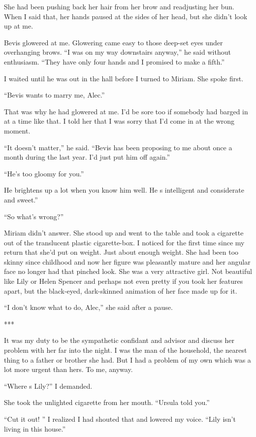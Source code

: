 \documentclass{novel}
\begin{document}
She had been pushing back her hair from her brow and readjusting her bun. When I said that, her hands paused at the sides of her head, but she didn’t look up at me.

Bevis glowered at me. Glowering came easy to those deep-set eyes under overhanging brows. “I was on my way downstairs anyway,” he said without enthusiasm. “They have only four hands and I promised to make a fifth.”

I waited until he was out in the hall before I turned to Miriam. She spoke first.

“Bevis wants to marry me, Alec.”

That was why he had glowered at me. I’d be sore too if somebody had barged in at a time like that. I told her that I was sorry that I’d come in at the wrong moment.

“It doesn’t matter,” he said. “Bevis has been proposing to me about once a month during the last year. I’d just put him off again.”

“He’s too gloomy for you.”

He brightens up a lot when you know him well. He s intelligent and considerate and sweet.”

“So what’s wrong?”

Miriam didn’t answer. She stood up and went to the table and took a cigarette out of the translucent plastic cigarette-box. I noticed for the first time since my return that she’d put on weight. Just about enough weight. She had been too skinny since childhood and now her figure was pleasantly mature and her angular face no longer had that pinched look. She was a very attractive girl. Not beautiful like Lily or Helen Spencer and perhaps not even pretty if you took her features apart, but the black-eyed, dark-skinned animation of her face made up for it.

“I don’t know what to do, Alec,” she said after a pause.

***

It was my duty to be the sympathetic confidant and advisor and discuss her problem with her far into the night. I was the man of the household, the nearest thing to a father or brother she had. But I had a problem of my own which was a lot more urgent than hers. To me, anyway.

“Where s Lily?” I demanded.

She took the unlighted cigarette from her mouth. “Ursula told you.”

“Cut it out! ” I realized I had shouted that and lowered my voice. “Lily isn’t living in this house.”
\end{document}
